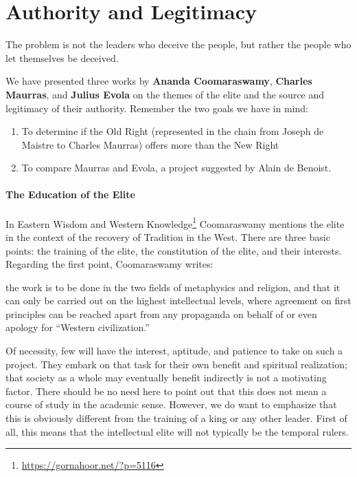 \section{Authority and Legitimacy}

\begin{quotex}
The problem is not the leaders who deceive the people, but rather the people who let themselves be deceived.
\end{quotex}


We have presented three works by \textbf{Ananda Coomaraswamy}, \textbf{Charles Maurras}, and \textbf{Julius Evola} on the themes of the elite and the source and legitimacy of their authority. Remember the two goals we have in mind:

\begin{enumerate}
\item To determine if the Old Right (represented in the chain from Joseph de Maistre to Charles Maurras) offers more than the New Right
\item To compare Maurras and Evola, a project suggested by Alain de Benoist.
\end{enumerate}


\paragraph{The Education of the Elite}


In Eastern Wisdom and Western Knowledge\footnote{\url{https://gornahoor.net/?p=5116}} Coomaraswamy mentions the elite in the context of the recovery of Tradition in the West. There are three basic points: the training of the elite, the constitution of the elite, and their interests. Regarding the first point, Coomaraswamy writes:

\begin{quotex}
the work is to be done in the two fields of metaphysics and religion, and that it can only be carried out on the highest intellectual levels, where agreement on first principles can be reached apart from any propaganda on behalf of or even apology for ``Western civilization.''
\end{quotex}


Of necessity, few will have the interest, aptitude, and patience to take on such a project. They embark on that task for their own benefit and spiritual realization; that society as a whole may eventually benefit indirectly is not a motivating factor. There should be no need here to point out that this does not mean a course of study in the academic sense. However, we do want to emphasize that this is obviously different from the training of a king or any other leader. First of all, this means that the intellectual elite will not typically be the temporal rulers.

